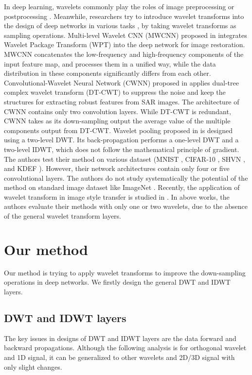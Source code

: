 \documentclass[10pt,twocolumn,letterpaper]{article}
\begin{document}
In deep learning, wavelets commonly play the roles of image preprocessing or postprocessing
\cite{huang2017wavelet, liu2018attribute, savareh2019wavelet, yuan2019waveletfcnn}.
Meanwhile, researchers try to introduce wavelet transforms into the design of deep networks in various tasks
\cite{liu2018multi,Williams2018Wavelet,duan2017sar,yoo2019photorealistic}, by taking wavelet transforms as sampling operations.
Multi-level Wavelet CNN (MWCNN) proposed in \cite{liu2018multi} integrates Wavelet Package Transform (WPT)
into the deep network for image restoration.
MWCNN concatenates the low-frequency and high-frequency components of the input feature map,
and processes them in a unified way,
while the data distribution in these components significantly differs from each other.
Convolutional-Wavelet Neural Network (CWNN) proposed in \cite{duan2017sar}
applies dual-tree complex wavelet transform (DT-CWT)
to suppress the noise and keep the structures for extracting robust features from SAR images.
The architecture of CWNN contains only two convolution layers.
While DT-CWT is redundant,
CWNN takes as its down-sampling output the average value of the multiple components output from DT-CWT.
Wavelet pooling proposed in \cite{Williams2018Wavelet} is designed using a two-level DWT.
Its back-propagation performs a one-level DWT and a two-level IDWT, which does not follow the mathematical principle of gradient.
The authors test their method on various dataset
(MNIST \cite{lecun1998gradient}, CIFAR-10 \cite{krizhevsky2009learning}, SHVN \cite{netzer2011reading},
and KDEF \cite{lundqvist1998karolinska}).
However, their network architectures contain only four or five convolutional layers.
The authors do not study systematically the potential of the method on standard image dataset like ImageNet \cite{deng2009imagenet}.
Recently, the application of wavelet transform in image style transfer is studied in \cite{yoo2019photorealistic}.
In above works, the authors evaluate their methods with only one or two wavelets,
due to the absence of the general wavelet transform layers.

\section{Our method}
Our method is trying to apply wavelet transforms to improve the down-sampling operations in deep networks.
We firstly design the general DWT and IDWT layers.

\subsection{DWT and IDWT layers}
The key issues in designs of DWT and IDWT layers are the data forward and backward propagations.
Although the following analysis is for orthogonal wavelet and 1D signal,
it can be generalized to other wavelets and 2D/3D signal with only slight changes.
\end{document}
